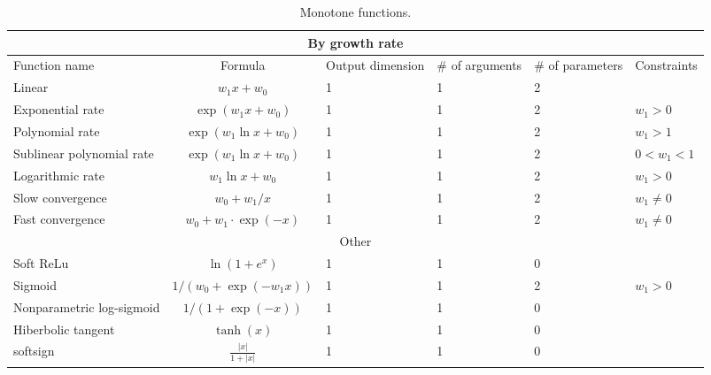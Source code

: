 \documentclass[12pt]{article}
\begin{document}
\begin{table}[!ht]
\caption{Monotone functions.}
\label{tb:monotone}
\begin{tabular}{|p{90pt}|c|p{50pt}|p{50pt}|p{50pt}|p{60pt}|}
\hline
\multicolumn{6}{|c|}{By growth rate} \\
\hline
Function name	&		Formula		&	Output dimension	&	$\#$ of arguments	&	$\#$ of parameters	&	Constraints	\\ \hline
Linear	&	$	w_1 x + w_0	$	&	1	&	1	&	2	\\ \hline
Exponential rate	&	$	\exp(w_1x + w_0)	$	&	1	&	1	&	2	&	$w_1 > 0$	\\ \hline
Polynomial rate	&	$	\exp(w_1\ln x + w_0)	$	&	1	&	1	&	2	&	$w_1 > 1$	\\ \hline
Sublinear polynomial rate	&	$\exp(w_1\ln x + w_0)$	&	1	&	1	&	2	&	$0 < w_1 < 1$	\\ \hline
Logarithmic rate	&	$	w_1\ln x + w_0	$	&	1	&	1	&	2	&	$w_1 > 0$	\\ \hline
Slow convergence	&	$	w_0 + w_1/x	$	&	1	&	1	&	2	&	$w_1 \neq 0$	\\ \hline
Fast convergence	&	$	w_0 + w_1\cdot\exp(-x)	$	&	1	&	1	&	2	&	$w_1 \neq 0 $	\\ 
\hline
\multicolumn{6}{|c|}{Other} \\
\hline
Soft ReLu & $\ln(1+e^{x}) $	&	1	&	1	&	0	&		\\ \hline
Sigmoid	&	$	1/(w_0 + \exp(-w_1x))	$	&	1	&	1	&	2	&	$w_1 > 0$	\\ \hline
Nonparametric log-sigmoid	&	$	1/(1 + \exp(-x))	$	&	1	&	1	&	0	& \\ \hline
Hiberbolic tangent	&	$	\tanh(x)	$	&	1	&	1	&	0 & 	\\ \hline
softsign & $\frac{|x|}{1+|x|}$	&	1	&	1	&	0	&		\\ \hline
\end{tabular}
\end{table}
\end{document}

